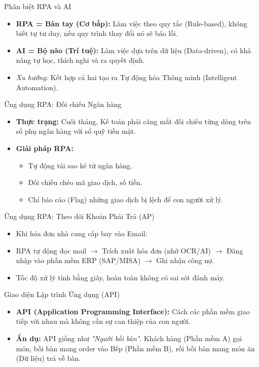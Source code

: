\documentclass[aspectratio=169,12pt]{beamer}
\begin{document}
\begin{frame}{Phân biệt RPA và AI}
    \begin{itemize}
        \item \textbf{RPA = Bàn tay (Cơ bắp):} Làm việc theo quy tắc (Rule-based), không biết tự tư duy, nếu quy trình thay đổi nó sẽ báo lỗi.
        \item \textbf{AI = Bộ não (Trí tuệ):} Làm việc dựa trên dữ liệu (Data-driven), có khả năng tự học, thích nghi và ra quyết định.
        \item \textit{Xu hướng:} Kết hợp cả hai tạo ra Tự động hóa Thông minh (Intelligent Automation).
    \end{itemize}
\end{frame}

\begin{frame}{Ứng dụng RPA: Đối chiếu Ngân hàng}
    \begin{itemize}
        \item \textbf{Thực trạng:} Cuối tháng, Kế toán phải căng mắt đối chiếu từng dòng trên sổ phụ ngân hàng với sổ quỹ tiền mặt.
        \item \textbf{Giải pháp RPA:} 
        \begin{itemize}
            \item Tự động tải sao kê từ ngân hàng.
            \item Đối chiếu chéo mã giao dịch, số tiền.
            \item Chỉ báo cáo (Flag) những giao dịch bị lệch để con người xử lý.
        \end{itemize}
    \end{itemize}
\end{frame}

\begin{frame}{Ứng dụng RPA: Theo dõi Khoản Phải Trả (AP)}
    \begin{itemize}
        \item Khi hóa đơn nhà cung cấp bay vào Email:
        \item RPA tự động đọc mail $\rightarrow$ Trích xuất hóa đơn (nhờ OCR/AI) $\rightarrow$ Đăng nhập vào phần mềm ERP (SAP/MISA) $\rightarrow$ Ghi nhận công nợ.
        \item Tốc độ xử lý tính bằng giây, hoàn toàn không có sai sót đánh máy.
    \end{itemize}
\end{frame}

\begin{frame}{Giao diện Lập trình Ứng dụng (API)}
    \begin{itemize}
        \item \textbf{API (Application Programming Interface):} Cách các phần mềm giao tiếp với nhau mà không cần sự can thiệp của con người.
        \item \textbf{Ẩn dụ:} API giống như \textit{"Người bồi bàn"}. Khách hàng (Phần mềm A) gọi món, bồi bàn mang order vào Bếp (Phần mềm B), rồi bồi bàn mang món ăn (Dữ liệu) trả về bàn.
    \end{itemize}
\end{frame}
\end{document}

